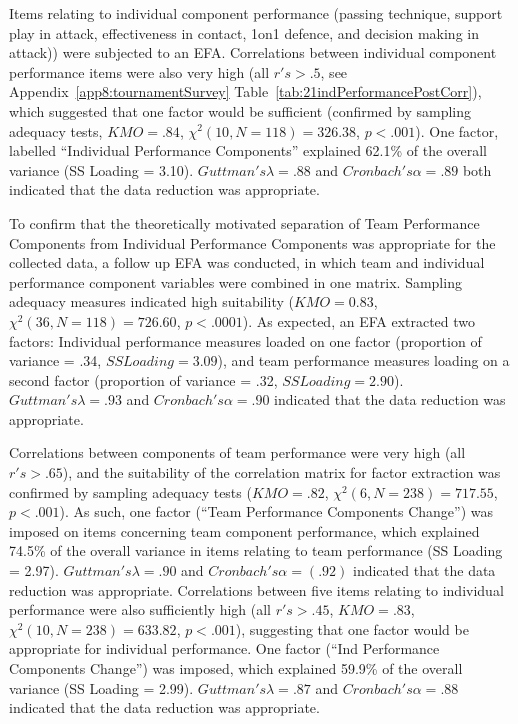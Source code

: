\begin{CJK}{UTF8}{gbsn}
Items relating to individual component performance (passing technique, support play in attack, effectiveness in contact, 1on1 defence, and decision making in attack))  were subjected to an EFA.  Correlations between individual component performance items were also very high (all $r's > .5$, see Appendix~\ref{app8:tournamentSurvey} Table~\ref{tab:21indPerformancePostCorr}), which suggested that one factor would be sufficient (confirmed by sampling adequacy tests, $KMO =  .84$, $\chi^2(10, N = 118) =  326.38$, $p < .001$).  One factor, labelled ``Individual Performance Components'' explained 62.1\% of the overall variance (SS Loading = 3.10).
$Guttman's \lambda =.88$ and $Cronbach's  \alpha = .89$ both indicated that the data reduction was appropriate.

To confirm that the theoretically motivated separation of Team Performance Components from Individual Performance Components was appropriate for the collected data, a follow up EFA was conducted, in which team and individual performance component variables were combined in one matrix.  Sampling adequacy measures indicated high suitability ($KMO = 0.83$, $\chi^2(36, N = 118) = 726.60$, $p < .0001$).  As expected, an EFA extracted two factors: Individual performance measures loaded on one factor (proportion of variance = .34, $SS Loading = 3.09$), and team performance measures loading on a second factor (proportion of variance = .32, $SS Loading = 2.90$). $Guttman's \lambda =.93$ and $Cronbach's \alpha = .90$ indicated that the data reduction was appropriate.

Correlations between components of team performance were very high (all $r's > .65$), and the suitability of the correlation matrix for factor extraction was confirmed by sampling adequacy tests ($KMO = .82$, $\chi^2(6, N = 238) = 717.55$, $p < .001$).  As such, one factor (``Team Performance Components Change'') was imposed on items concerning team component performance, which explained 74.5\% of the overall variance in items relating to team performance (SS Loading = 2.97). $Guttman's \lambda =.90$ and $Cronbach's \alpha = (.92)$ indicated that the data reduction was appropriate.  Correlations between five items relating to individual performance were also sufficiently high (all $r's > .45$, $KMO = .83$, $\chi^2(10, N = 238) = 633.82$, $p < .001$), suggesting that one factor would be appropriate for individual performance.  One factor (``Ind Performance Components Change'') was imposed, which explained 59.9\% of the overall variance (SS Loading = 2.99).  $Guttman's\lambda =.87$ and $Cronbach's \alpha = .88$ indicated that the data reduction was appropriate.


\end{CJK}

